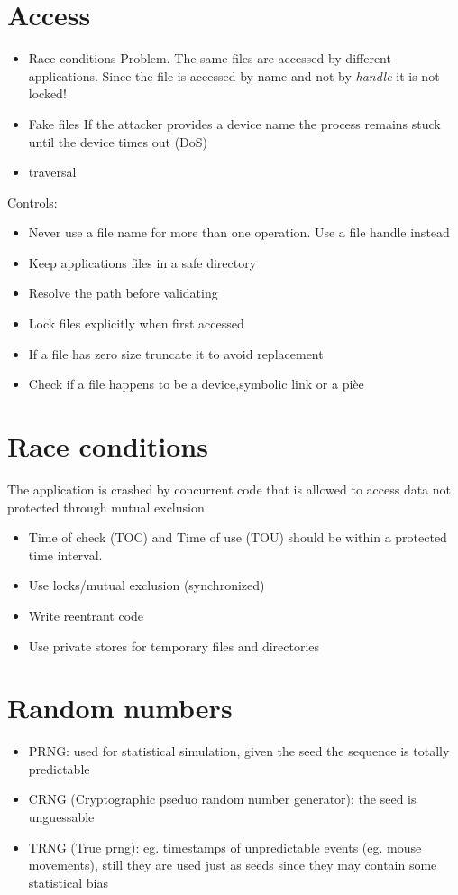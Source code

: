 \documentclass[10pt,a4paper]{book}
\begin{document}
\section{Access}
\begin{itemize}
\item Race conditions
Problem. The same files are accessed by different applications. Since the file is accessed by name and not by \emph{handle} it is not locked!
\item Fake files
If the attacker provides a device name the process remains stuck until the device times out (DoS)
\item traversal
\end{itemize}
Controls:
\begin{itemize}
\item Never use a file name for more than one operation. Use a file handle instead
\item Keep applications files in a safe directory
\item Resolve the path before validating
\item Lock files explicitly when first accessed
\item If a file has zero size truncate it to avoid replacement
\item Check if a file happens to be a device,symbolic link or a pièe
\end{itemize}
\section{Race conditions}
The application is crashed by concurrent code that is allowed to access data not protected through mutual exclusion.
\begin{itemize}
\item Time of check (TOC) and Time of use (TOU) should be within a protected time interval.
\item Use locks/mutual exclusion (synchronized)
\item Write reentrant code
\item Use private stores for temporary files and directories
\end{itemize}
\section{Random numbers}
\begin{itemize}
\item PRNG: used for statistical simulation, given the seed the sequence is totally predictable
\item CRNG (Cryptographic pseduo random number generator): the seed is unguessable
\item TRNG (True prng): eg. timestamps of unpredictable events (eg. mouse movements), still they are used just as seeds since they may contain some statistical bias
\end{itemize}
\end{document}
